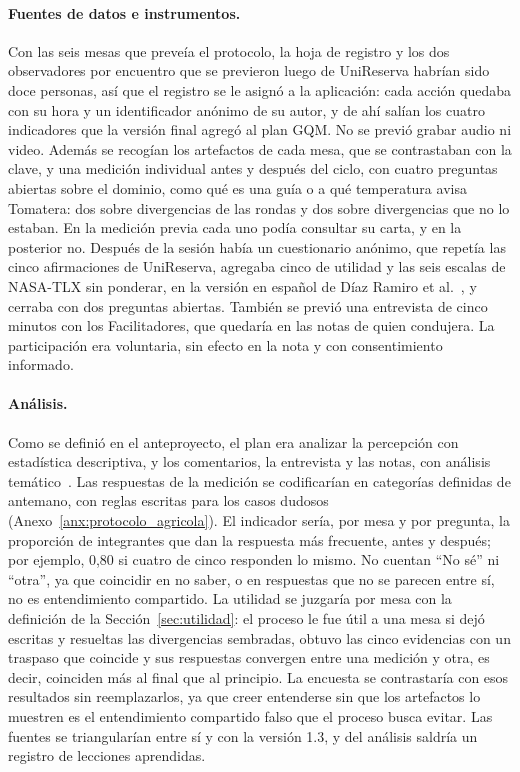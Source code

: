 \documentclass[12pt,letterpaper,oneside]{report}
\begin{document}
\paragraph{Fuentes de datos e instrumentos.}
Con las seis mesas que preveía el protocolo, la hoja de registro y los dos
observadores por encuentro que se previeron luego de UniReserva habrían sido
doce personas, así que el registro se le asignó a la aplicación: cada acción
quedaba con su hora y un identificador anónimo de su autor, y de ahí salían los
cuatro indicadores que la versión final agregó al plan GQM. No se previó grabar
audio ni video. Además se recogían los artefactos de cada mesa, que se
contrastaban con la clave, y una medición individual antes y después del ciclo,
con cuatro preguntas abiertas sobre el dominio, como qué es una guía o a qué
temperatura avisa Tomatera: dos sobre divergencias de las rondas y dos sobre
divergencias que no lo estaban. En la medición previa cada uno podía consultar
su carta, y en la posterior no. Después de la sesión había un cuestionario
anónimo, que repetía las cinco afirmaciones de UniReserva, agregaba cinco de
utilidad y las seis escalas de NASA-TLX sin ponderar, en la versión en español
de Díaz Ramiro et al.~\cite{diaz2010nasatlx}, y cerraba con dos preguntas
abiertas. También se previó una entrevista de cinco minutos con los
Facilitadores, que quedaría en las notas de quien condujera. La participación era
voluntaria, sin efecto en la nota y con consentimiento informado.

\paragraph{Análisis.}
Como se definió en el anteproyecto, el plan era analizar la percepción con
estadística descriptiva, y los comentarios, la entrevista y las notas, con
análisis temático~\cite{braun2006thematic}. Las respuestas de la medición se
codificarían en categorías definidas de antemano, con reglas escritas para los
casos dudosos (Anexo~\ref{anx:protocolo_agricola}). El indicador sería, por mesa
y por pregunta, la proporción de integrantes que dan la respuesta más frecuente,
antes y después; por ejemplo, 0,80 si cuatro de cinco responden lo mismo. No
cuentan ``No sé'' ni ``otra'', ya que coincidir en no saber, o en respuestas que
no se parecen entre sí, no es entendimiento compartido. La utilidad se juzgaría
por mesa con la definición de la Sección~\ref{sec:utilidad}: el proceso le fue
útil a una mesa si dejó escritas y resueltas las divergencias sembradas, obtuvo
las cinco evidencias con un traspaso que coincide y sus respuestas convergen
entre una medición y otra, es decir, coinciden más al final que al principio.
La encuesta se contrastaría con esos resultados sin reemplazarlos, ya que creer
entenderse sin que los artefactos lo muestren es el entendimiento compartido
falso que el proceso busca evitar. Las fuentes se triangularían entre sí y con
la versión 1.3, y del análisis saldría un registro de lecciones aprendidas.
\end{document}
